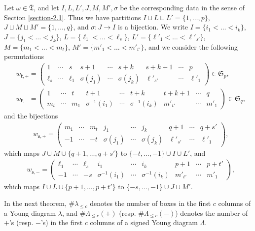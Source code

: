 \documentclass[11pt]{article}
\theoremstyle{definition}
\numberwithin{equation}{section}
\newcommand{\fk}{\mathfrak{k}}
\newcommand{\fs}{\mathfrak{s}}
\newcommand{\nrboxes}[2]{\# #1_{\leq #2}}
\newcommand{\nrplus}[2]{\# #1_{\leq #2}(+)}
\newcommand{\nrminus}[2]{\# #1_{\leq #2}(-)}
\newcommand{\permutationsof}[1]{\mathfrak{S}_{#1}}
\newcommand{\ppermutationsof}{\mathfrak{T}}
\newcommand{\parameters}{\overline{\ppermutationsof}}
\begin{document}
Let $\omega\in\parameters$, and let $I,L,L',J,M,M',\sigma$ be the corresponding data in the sense of Section \ref{section-2.1}. Thus we have partitions $I\sqcup L\sqcup L'=\{1,\ldots,p\}$, $J\sqcup M\sqcup M'=\{1,\ldots,q\}$, and $\sigma:J\to I$ is a bijection.
We write $I=\{i_1<\ldots<i_k\}$, $J=\{j_1<\ldots<j_k\}$,
$L=\{\ell_1<\ldots<\ell_s\}$, $L'=\{\ell'_1<\ldots<\ell'_{s'}\}$, $M=\{m_1<\ldots<m_t\}$, $M'=\{m'_1<\ldots<m'_{t'}\}$,
and we consider the following permutations
\begin{eqnarray}
\label{wk+} & w_{\fk,+}=\begin{pmatrix} 1 & \cdots & s & s+1 & \cdots & s+k & s+k+1 & \cdots & p\\
\ell_s & \cdots & \ell_1 & \sigma(j_1) & \cdots & \sigma(j_k) & \ell'_{s'} & \cdots & \ell'_1\end{pmatrix}\in\permutationsof{p},\\
\label{wk-} & w_{\fk,-}=\begin{pmatrix} 1 & \cdots & t & t+1 & \cdots & t+k & t+k+1 & \cdots & q\\
m_t & \cdots & m_1 & \sigma^{-1}(i_1) & \cdots & \sigma^{-1}(i_k) & m'_{t'} & \cdots & m'_1\end{pmatrix}\in\permutationsof{q},
\end{eqnarray}
and the bijections
\begin{eqnarray}
\label{ws+} & w_{\fs,+} = \begin{pmatrix} m_1 & \cdots & m_t & j_1 & \cdots & j_k & q+1 & \cdots & q+s'\\
-1 & \cdots & -t & \sigma(j_1) & \cdots & \sigma(j_k) & \ell'_{s'} & \cdots & \ell'_1 \end{pmatrix},
\end{eqnarray}
which maps $J\cup M\cup\{q+1,\ldots,q+s'\}$ to $\{-t,\ldots,-1\}\cup I\cup L'$, and
\begin{eqnarray}
\label{ws-} & w_{\fs,-} = \begin{pmatrix} \ell_1 & \cdots & \ell_s & i_1 & \cdots & i_k & p+1 & \cdots & p+t'\\
-1 & \cdots & -s & \sigma^{-1}(i_1) & \cdots & \sigma^{-1}(i_k) & m'_{t'} & \cdots & m'_1 \end{pmatrix},
\end{eqnarray}
which maps $I\cup L\cup\{p+1,\ldots,p+t'\}$ to $\{-s,\ldots,-1\}\cup J\cup M'$.

In the next theorem,
 $\nrboxes{\lambda}{c}$ denotes the number of boxes in the first $c$ columns of a Young diagram $\lambda$, and $\nrplus{\Lambda}{c}$ (resp. $\nrminus{\Lambda}{c}$) denotes the number of $+$'s (resp. $-$'s) in the first $c$ columns of a signed Young diagram $\Lambda$.
\end{document}
